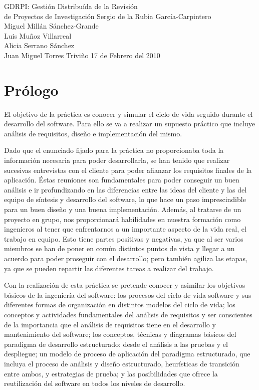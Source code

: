 \documentclass[12pt,a4paper,spanish,twoside]{book}
\begin{document}
{GDRPI: Gestión Distribuída de la Revisión\\de Proyectos de Investigación}
{Sergio de la Rubia García-Carpintero\\Miguel Millán Sánchez-Grande\\Luis
  Muñoz Villarreal\\Alicia Serrano Sánchez\\Juan Miguel Torres Triviño}
{17 de Febrero del 2010}


\tableofcontents
\newpage

\listoffigures

\chapter*{Prólogo}
El objetivo de la práctica es conocer y simular el ciclo de vida seguido
durante el desarrollo del software. Para ello se va a realizar un supuesto
práctico que incluye análisis de requisitos, diseño e implementación del
mismo. 

Dado que el enunciado fijado para la práctica no proporcionaba toda la
información necesaria para poder desarrollarla, se han tenido que realizar
sucesivas entrevistas con el cliente para poder afianzar los requisitos finales
de la aplicación. Éstas reuniones son fundamentales para poder conseguir un
buen análisis e ir profundizando en las diferencias entre las ideas del
cliente y las del equipo de síntesis y desarrollo del software, lo que hace
un paso imprescindible para un buen diseño y una buena
implementación. Además, al tratarse de un proyecto en grupo, nos
proporcionará habilidades en nuestra formación como ingenieros al tener que
enfrentarnos a un importante aspecto de la vida real, el trabajo en
equipo. Esto tiene partes positivas y negativas, ya que al ser varios
miembros se han de poner en común distintos puntos de vista y llegar a un
acuerdo para poder proseguir con el desarrollo; pero también agiliza las
etapas, ya que se pueden repartir las diferentes tareas a realizar del
trabajo. 

Con la realización de esta práctica se pretende conocer y asimilar los
objetivos básicos de la ingeniería del software: los procesos del ciclo de
vida software y sus diferentes formas de organización en distintos modelos
del ciclo de vida; los conceptos y actividades fundamentales del análisis
de requisitos y ser conscientes de la importancia que el análisis de
requisitos tiene en el desarrollo y mantenimiento del software; los conceptos,
técnicas y diagramas básicos del paradigma de desarrollo estructurado: desde
el análisis a las pruebas y el despliegue; un modelo de proceso de aplicación
del paradigma estructurado, que incluya el proceso de análisis y diseño
estructurado, heurísticas de transición entre ambos, y estrategias de prueba;
y las posibilidades que ofrece la reutilización del software en todos los
niveles de desarrollo. 
\end{document}
